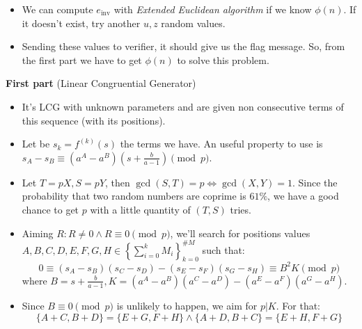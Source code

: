 \documentclass[a0paper,portrait]{baposter}
\begin{document}
\begin{poster}
{\begin{itemize}
      \vspace{-1em}
      \begin{equation*}
        g^z \cdot h^e \equiv g^z \cdot \left((u \cdot g^{-z})^{e_\text{inv}}\right)^e \equiv g^z \cdot u \cdot g^{-z} \equiv u \pmod{n}
      \end{equation*}


      \vspace{-0.6em}
    \item We can compute $e_\text{inv}$ with \textit{Extended Euclidean algorithm} if we know
      $\phi(n)$.
      If it doesn't exist, try another $u,z$ random values.
    \item Sending these values to verifier, it should give us the flag message.
      So, from the first part we have to get $\phi(n)$ to solve this problem.
  \end{itemize}

  \vspace{-0.5em}
  \textbf{First part} (Linear Congruential Generator)

  \vspace{-0.5em}
  \begin{itemize}
    \item It's LCG with unknown parameters and are given non consecutive terms of
      this sequence (with its positions).
    \item Let be $s_k \! = \! f^{(k)}(s)$ the terms we have.
      An useful property to use is $s_A - s_B \equiv (a^A-a^B)\left(s+\frac{b}{a-1}\right)\pmod{p}$.
    \item Let $T \! = \! pX, S \! = \! pY$, then $\gcd(S,T) \! = \! p \! \iff \! \gcd(X,Y) \! = \! 1$.
      Since the probability that two random numbers are coprime is $61\%$,
      we have a good chance to get $p$ with a little quantity of $(T,S)$ tries.
    \item Aiming $R : R \! \neq \! 0 \land R \! \equiv \! 0 \pmod{p}$,
      we'll search for positions values $A,B,C,D,E,F,G,H \in \left\{\sum_{i=0}^k M_i\right\}_{k=0}^{\# M}$ such that:
      \begin{equation*}
          0 \equiv (s_A-s_B)(s_C-s_D)-(s_E-s_F)(s_G-s_H)
            \equiv B^2 K\pmod{p}
      \end{equation*}
      where $B = s+\frac{b}{a-1}, K = (a^A-a^B)(a^C-a^D)-(a^E-a^F)(a^G-a^H)$.
    \item Since $B \equiv 0 \pmod{p}$ is unlikely to happen, we aim for $p|K$. For that:
      \begin{equation*}
        \{A+C,B+D\} = \{E+G,F+H\} \land \{A+D,B+C\} = \{E+H,F+G\}
      \end{equation*}


\end{itemize}}
\end{poster}
\end{document}
